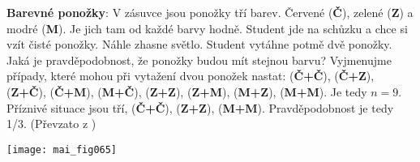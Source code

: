 \begin{mdframed}[style=mdexam]
  \begin{example}\label{mai:exam006}
    \textbf{Barevné ponožky}:\newline
    V zásuvce jsou ponožky tří barev. Červené (\textbf{Č}), zelené (\textbf{Z}) a modré
    (\textbf{M}). Je jich tam od každé barvy hodně. Student jde na schůzku a chce si vzít čisté
    ponožky. Náhle zhasne světlo. Student vytáhne potmě dvě ponožky. Jaká je pravděpodobnost, že
    ponožky budou mít stejnou barvu? Vyjmenujme případy, které mohou při vytažení dvou ponožek
    nastat: (\textbf{Č+Č}), (\textbf{Č+Z}), (\textbf{Z+Č}), (\textbf{Č+M}), (\textbf{M+Č}),
    (\textbf{Z+Z}), (\textbf{Z+M}), (\textbf{M+Z}), (\textbf{M+M}). Je tedy \(n = 9\). Příznivé
    situace jsou tří, (\textbf{Č+Č}), (\textbf{Z+Z}), (\textbf{M+M}). Pravděpodobnost je tedy 1/3.
    (Převzato z \cite[s.~200]{Musilova2009MA1}) 

    {\centering
    \captionsetup{type=figure} 
    \texttt{[image: mai\_fig065]}
    \label{mai:fig065}
    \par}
  \end{example}
\end{mdframed}  